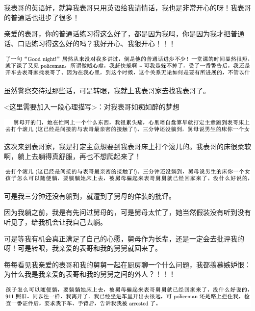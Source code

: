 \documentclass[9pt, b5paper]{article}
\begin{document}
我表哥的英语好，就算我表哥只用英语给我请情话，我也是非常开心的呀！我表哥的普通话也进步了很多！

亲爱的表哥，你的普通话练习得这么好了，都是因为我吗，你是因为我才把普通话、口语练习得这么好的吗？我好开心、我狠开心！！！

\begin{center}
\includegraphics[width=.9\linewidth]{./pic/backups_plans_20210505_212047.png}
\end{center}

虽然警察交待过那些话，可是转眼，我就上我表哥家去找我表哥了。 

<这里需要加入一段心理描写>：对我表哥如痴如醉的梦想

\begin{center}
\includegraphics[width=.9\linewidth]{./pic/backups_plans_20210505_213416.png}
\end{center}

这次来到表哥家，我是打定主意想要到我表哥床上打个滚儿的。我表哥的床很柔软啊，躺上去躺得真舒服，再也不想爬起来了！

\begin{center}
\includegraphics[width=.9\linewidth]{./pic/backups_plans_20210505_213427.png}
\end{center}

可是我三分钟还没有躺到，就遭到了舅母的佯装的批评。

因为我躺之前，我是有先问过舅母的，可是舅母太忙了，她当然假装没有听到没有听见了，给我机会让我自己去躺。

可是等我有机会真正满足了自己的心愿，舅母作为长辈，还是一定会去批评我的呀！可是转眼，我亲爱的表哥和我的舅舅就回来了。 

每每看见我亲爱的表哥和我的舅舅一起在厨房聊一个什么问题，我都羡慕嫉妒恨：为什么我是我亲爱的表哥和我的舅舅之间的外人？！！！

\begin{center}
\includegraphics[width=.9\linewidth]{./pic/backups_plans_20210505_214300.png}
\end{center}
\end{document}
